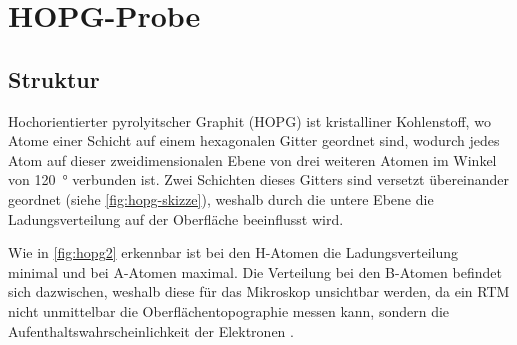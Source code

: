 \section{HOPG-Probe}\label{sec:hopg-probe}
\subsection*{Struktur}
Hochorientierter pyrolyitscher Graphit (HOPG) ist kristalliner Kohlenstoff, wo Atome einer Schicht
auf einem hexagonalen Gitter geordnet sind, wodurch jedes Atom auf dieser zweidimensionalen 
Ebene von drei weiteren Atomen im Winkel von \SI{120}{\degree} verbunden ist. Zwei Schichten 
dieses Gitters sind versetzt übereinander geordnet (siehe \cref{fig:hopg-skizze}), weshalb durch die 
untere Ebene die Ladungsverteilung auf der Oberfläche beeinflusst wird.\par Wie in 
\cref{fig:hopg2} erkennbar ist bei den H-Atomen die Ladungsverteilung minimal und bei A-Atomen maximal.
Die Verteilung bei den B-Atomen befindet sich dazwischen, weshalb diese für das Mikroskop unsichtbar werden,
da ein RTM nicht unmittelbar die Oberflächentopographie messen kann, sondern die Aufenthaltswahrscheinlichkeit der 
Elektronen \cite[Kap.1 S.7]{rtm-leitpfaden}.

